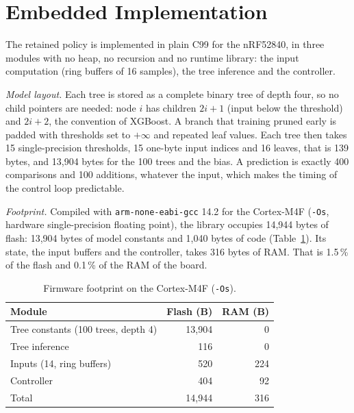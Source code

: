\documentclass[conference]{IEEEtran}
\newcommand{\pct}{\,\%}
\begin{document}
\section{Embedded Implementation}\label{sec:embedded}
The retained policy is implemented in plain C99 for the nRF52840, in three modules with no heap, no recursion and no runtime library: the input computation (ring buffers of 16 samples), the tree inference and the controller.

\emph{Model layout.} Each tree is stored as a complete binary tree of depth four, so no child pointers are needed: node $i$ has children $2i+1$ (input below the threshold) and $2i+2$, the convention of XGBoost. A branch that training pruned early is padded with thresholds set to $+\infty$ and repeated leaf values. Each tree then takes 15 single-precision thresholds, 15 one-byte input indices and 16 leaves, that is 139 bytes, and 13,904 bytes for the 100 trees and the bias. A prediction is exactly 400 comparisons and 100 additions, whatever the input, which makes the timing of the control loop predictable.

\emph{Footprint.} Compiled with \texttt{arm-none-eabi-gcc} 14.2 for the Cortex-M4F (\texttt{-Os}, hardware single-precision floating point), the library occupies 14,944 bytes of flash: 13,904 bytes of model constants and 1,040 bytes of code (Table~\ref{tab:footprint}). Its state, the input buffers and the controller, takes 316 bytes of RAM. That is 1.5\pct{} of the flash and 0.1\pct{} of the RAM of the board.

\begin{table}[t]
\centering
\caption{Firmware footprint on the Cortex-M4F (\texttt{-Os}).}
\label{tab:footprint}
\setlength{\tabcolsep}{4pt}
\begin{tabular}{@{}lrr@{}}
\toprule
Module & Flash (B) & RAM (B) \\
\midrule
Tree constants (100 trees, depth 4) & 13,904 & 0 \\
Tree inference & 116 & 0 \\
Inputs (14, ring buffers) & 520 & 224 \\
Controller & 404 & 92 \\
\midrule
Total & 14,944 & 316 \\
\bottomrule
\end{tabular}
\end{table}
\end{document}
